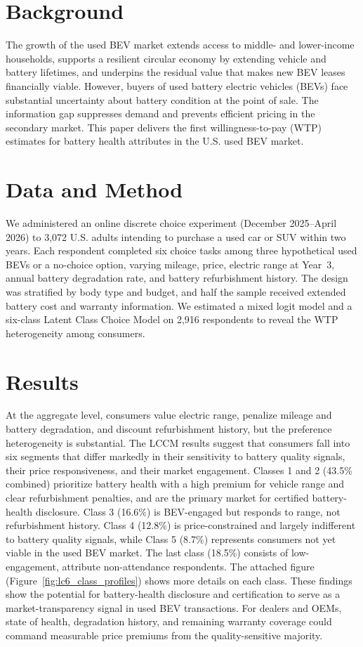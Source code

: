 \documentclass[12pt,a4paper]{extarticle}
\begin{document}
\section*{Background}

The growth of the used BEV market extends access to middle- and lower-income households, supports a resilient circular economy by extending vehicle and battery lifetimes, and underpins the residual value that makes new BEV leases financially viable. However, buyers of used battery electric vehicles (BEVs) face substantial uncertainty about battery condition at the point of sale. The information gap suppresses demand and prevents efficient pricing in the secondary market. This paper delivers the first willingness-to-pay (WTP) estimates for battery health attributes in the U.S. used BEV market. 

\section*{Data and Method}

We administered an online discrete choice experiment (December 2025--April 2026) to 3,072 U.S. adults intending to purchase a used car or SUV within two years. Each respondent completed six choice tasks among three hypothetical used BEVs or a no-choice option, varying mileage, price, electric range at Year~3, annual battery degradation rate, and battery refurbishment history. The design was stratified by body type and budget, and half the sample received extended battery cost and warranty information. We estimated a mixed logit model and a six-class Latent Class Choice Model on 2,916 respondents to reveal the WTP heterogeneity among consumers.

\section*{Results}

At the aggregate level, consumers value electric range, penalize mileage and battery degradation, and discount refurbishment history, but the preference heterogeneity is substantial. The LCCM results suggest that consumers fall into six segments that differ markedly in their sensitivity to battery quality signals, their price responsiveness, and their market engagement. Classes 1 and 2 (43.5\% combined) prioritize battery health with a high premium for vehicle range and clear refurbishment penalties, and are the primary market for certified battery-health disclosure. Class 3 (16.6\%) is BEV-engaged but responds to range, not refurbishment history. Class 4 (12.8\%) is price-constrained and largely indifferent to battery quality signals, while Class 5 (8.7\%) represents consumers not yet viable in the used BEV market. The last class (18.5\%) consists of low-engagement, attribute non-attendance respondents. The attached figure (Figure~\ref{fig:lc6_class_profiles}) shows more details on each class. These findings show the potential for battery-health disclosure and certification to serve as a market-transparency signal in used BEV transactions. For dealers and OEMs, state of health, degradation history, and remaining warranty coverage could command measurable price premiums from the quality-sensitive majority.
\end{document}
